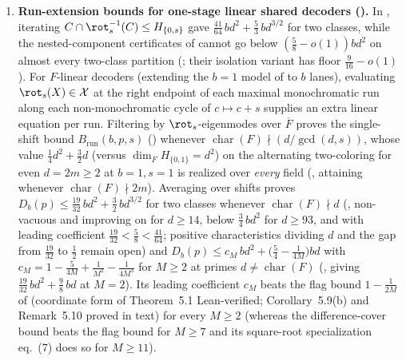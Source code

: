 \begin{enumerate}[label=\arabic*.]
\item \textbf{Run-extension bounds for one-stage linear shared decoders ().}
  In \cite[Theorem~3.4]{SharedDecoders2026}, iterating
  $C \cap \rot_s^{-1}(C) \le H_{\{0,s\}}$ gave $\frac{41}{64}\,bd^2 + \frac{5}{3}\,bd^{3/2}$ for two
  classes, while the nested-component certificates of \cite{SharedDecoders2026} cannot go below
  $(\frac{5}{8} - o(1))bd^2$ on almost every two-class partition (\cite[Theorem~C.6]{SharedDecoders2026};
  their isolation variant \cite[Theorem~C.7]{SharedDecoders2026} has floor $\frac{9}{16} - o(1)$). For
  $F$-linear decoders (extending the $b = 1$ model of \cite[Definition~6.3 and
  Problem~9.1(a)]{SeventeenthPaper2026} to $b$ lanes), evaluating $\rot_s(X) \in \mathcal{X}$ at the
  right endpoint of each maximal monochromatic run along each non-monochromatic cycle of
  $c \mapsto c + s$ supplies an extra linear equation per run. Filtering by $\rot_s$-eigenmodes over
  $\overline{F}$ proves the single-shift bound $B_{\mathrm{run}}(b, p, s)$
  () whenever $\operatorname{char}(F) \nmid (d/\gcd(d,s))$, whose value
  $\frac{1}{4}d^2 + \frac{3}{2}d$ (versus $\dim_F H_{\{0,1\}} = d^2$) on the alternating two-coloring
  for even $d = 2m \ge 2$ at $b = 1, s = 1$ is realized over \emph{every} field
  (, attaining  whenever
  $\operatorname{char}(F) \nmid 2m$). Averaging over shifts proves
  $D_b(p) \le \frac{19}{32}\,bd^2 + \frac{3}{2}\,bd^{3/2}$ for two classes whenever
  $\operatorname{char}(F) \nmid d$ (, non-vacuous and improving on
  \cite[Theorem~3.4]{SharedDecoders2026} for $d \ge 14$, below $\frac{3}{4}\,bd^2$ for $d \ge 93$, and
  with leading coefficient $\frac{19}{32} < \frac{5}{8} < \frac{41}{64}$; positive characteristics
  dividing $d$ and the gap from $\frac{19}{32}$ to $\frac{1}{2}$ remain open) and
  $D_b(p) \le c_M\,bd^2 + \bigl(\frac{5}{4} - \frac{1}{4M}\bigr)bd$ with
  $c_M = 1 - \frac{5}{4M} + \frac{1}{M^2} - \frac{1}{4M^3}$ for $M \ge 2$ at primes
  $d \ne \operatorname{char}(F)$ (, giving $\frac{19}{32}\,bd^2 + \frac{9}{8}\,bd$
  at $M = 2$). Its leading coefficient $c_M$ beats the flag bound $1 - \frac{1}{2M}$ of
  \cite[Theorem~5.1, Corollary~5.9(b), Remark~5.10, and Problem~9.1(a)]{SeventeenthPaper2026}
  (coordinate form of Theorem~5.1 Lean-verified; Corollary~5.9(b) and Remark~5.10 proved in text)
  for every $M \ge 2$ (whereas the difference-cover bound \cite[Theorem~3.5, eq.~(6)]{SharedDecoders2026}
  beats the flag bound for $M \ge 7$ and its square-root specialization eq.~(7) does so for $M \ge 11$).

\end{enumerate}

